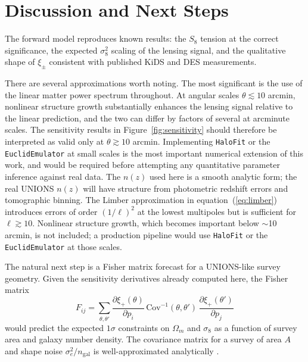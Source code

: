 \documentclass[12pt, a4paper]{article}
\begin{document}
\section{Discussion and Next Steps}
 
The forward model reproduces known results: the $S_8$ tension at the correct
significance, the expected $\sigma_8^2$ scaling of the lensing signal, and the
qualitative shape of $\xi_\pm$ consistent with published KiDS and DES
measurements.

There are several approximations worth noting. The most significant is the use 
of the linear matter power spectrum throughout. At angular scales 
$\theta \lesssim 10$ arcmin, nonlinear structure growth substantially enhances 
the lensing signal relative to the linear prediction, and the two can differ by 
factors of several at arcminute scales. The sensitivity results in 
Figure~\ref{fig:sensitivity} should therefore be interpreted as valid only at 
$\theta \gtrsim 10$ arcmin. Implementing \texttt{HaloFit} \citep{Smith2003} or 
the \texttt{EuclidEmulator} \citep{EuclidEmulator2021} at small scales is the 
most important numerical extension of this work, and would be required before 
attempting any quantitative parameter inference against real data. The $n(z)$ used here is a smooth
analytic form; the real UNIONS $n(z)$ will have structure from photometric
redshift errors and tomographic binning. The Limber approximation in
equation~(\ref{eq:limber}) introduces errors of order $(1/\ell)^2$ at the
lowest multipoles but is sufficient for $\ell \gtrsim 10$. Nonlinear structure
growth, which becomes important below $\sim$10 arcmin, is not included; a
production pipeline would use \texttt{HaloFit} \citep{Smith2003} or the
\texttt{EuclidEmulator} \citep{EuclidEmulator2021} at those scales.
 
The natural next step is a Fisher matrix forecast for a UNIONS-like survey
geometry. Given the sensitivity derivatives already computed here, the Fisher
matrix
\begin{equation}
    F_{ij} = \sum_{\theta,\theta'}
    \frac{\partial\xi_+(\theta)}{\partial p_i}\,
    \text{Cov}^{-1}(\theta,\theta')\,
    \frac{\partial\xi_+(\theta')}{\partial p_j}
\end{equation}
would predict the expected $1\sigma$ constraints on $\Omega_m$ and $\sigma_8$
as a function of survey area and galaxy number density. The covariance matrix
for a survey of area $A$ and shape noise $\sigma_e^2/n_\mathrm{gal}$ is
well-approximated analytically \citep{Joachimi2008}.
 
\end{document}
